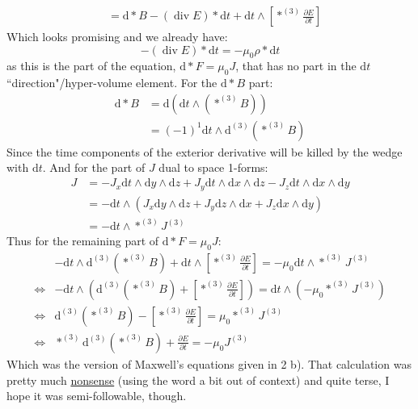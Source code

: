\documentclass[12pt,a4]{article}
\DeclareMathOperator{\Div}{div}
\newcommand{\e}{\mathrm{d}}
\begin{document}
\begin{enumerate}
\begin{enumerate}
\begin{align*}
                 &= \e * B - (\Div E ) *\e t + \e t \wedge \left[*^{(3)}\frac{\partial E}{\partial t} \right]
        \end{align*}
        Which looks promising and we already have:
        \begin{equation*}
          - (\Div E ) *\e t = - \mu_0 \rho *\e t
        \end{equation*}
        as this is the part of the equation, $\e * F = \mu_0 J$, that has no part in the $\e t$ ``direction"/hyper-volume element.
        For the $\e * B$ part:
        \begin{align*}
          \e * B &= \e (\e t \wedge (*^{(3)} B))\\
                 &= (-1)^1\e t \wedge \e^{(3)}(*^{(3)} B)
        \end{align*}
        Since the time components of the exterior derivative will be killed by the wedge with $\e t$.
        And for the part of $J$ dual to space 1-forms:
        \begin{align*}
          J &= - J_x \e t \wedge \e y \wedge \e z +  J_y \e t \wedge \e x \wedge \e z -  J_z \e t \wedge \e x \wedge \e y\\
            &= - \e t \wedge \left(J_x \e y \wedge \e z +  J_y \e z \wedge \e x +  J_z \e x \wedge \e y\right)\\
            &= - \e t \wedge *^{(3)}J^{(3)}
        \end{align*}
        Thus for the remaining part of $\e * F = \mu_0 J$:
        \begin{align*}
                          & -\e t \wedge \e^{(3)}(*^{(3)} B) + \e t \wedge \left[*^{(3)}\frac{\partial E}{\partial t} \right]= - \mu_0 \e t \wedge *^{(3)}J^{(3)}\\
          \Leftrightarrow & -\e t \wedge \left(\e^{(3)}(*^{(3)} B) + \left[*^{(3)}\frac{\partial E}{\partial t} \right]\right) = \e t \wedge \left(- \mu_0 *^{(3)}J^{(3)}\right)\\
          \Leftrightarrow & \e^{(3)}(*^{(3)} B) - \left[*^{(3)}\frac{\partial E}{\partial t} \right] = \mu_0 *^{(3)}J^{(3)}\\
          \Leftrightarrow & *^{(3)} \e^{(3)}(*^{(3)} B) + \frac{\partial E}{\partial t} = - \mu_0 J^{(3)}
        \end{align*}
        Which was the version of Maxwell's equations given in 2 b). 
        That calculation was pretty much \href{https://en.wikipedia.org/wiki/Abstract\_nonsense}{nonsense} (using the word a bit out of context) and quite terse, I hope it was semi-followable, though.

\end{enumerate}
\end{enumerate}
\end{document}
